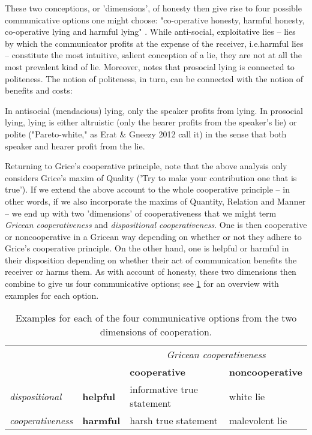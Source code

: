 These two conceptions, or 'dimensions', of honesty then give rise to four possible communicative options one might choose: "co-operative honesty, harmful honesty, co-operative lying and harmful lying" \citep[p.~45]{Dor17}.
While anti-social, exploitative lies -- lies by which the communicator profits at the expense of the receiver, i.e.\@ harmful lies -- constitute the most intuitive, salient conception of a lie, they are not at all the most prevalent kind of lie. Moreover, \citet{Meibauer18} notes that prosocial lying is connected to politeness. The notion of politeness, in turn, can be connected with the notion of benefits and costs:
\begin{quoting}
    In antisocial (mendacious) lying, only the speaker profits from lying. In prosocial lying, lying is either altruistic (only the hearer profits from the speaker's lie) or polite ("Pareto-white," as Erat \& Gneezy 2012 call it) in the sense that both speaker and hearer profit from the lie.
\end{quoting}

Returning to Grice's cooperative principle, note that the above analysis only considers Grice's maxim of Quality ('Try to make your contribution one that is true'). If we extend the above account to the whole cooperative principle -- in other words, if we also incorporate the maxims of Quantity, Relation and Manner -- we end up with two 'dimensions' of cooperativeness that we might term \emph{Gricean cooperativeness} and \emph{dispositional cooperativeness}. One is then cooperative or noncooperative in a Gricean way depending on whether or not they adhere to Grice's cooperative principle. On the other hand, one is helpful or harmful in their disposition depending on whether their act of communication benefits the receiver or harms them.
As with  account of honesty,
these two dimensions then combine to give us four communicative options; see \cref{tab:dimensions-of-cooperation} for an overview with examples for each option.

\begin{table}[ht]
  \centering
\begin{tabular}{lll|l}
  \cline{3-4}
  & & \multicolumn{2}{c}{\emph{Gricean cooperativeness}} \\ \cline{3-4}
  & & \textbf{cooperative} & \textbf{noncooperative} \\ \hline
  \emph{dispositional} &
  \textbf{helpful} & informative true statement & white lie \\ \cline{2-4}
  \emph{cooperativeness} &
  \textbf{harmful} & harsh true statement & malevolent lie \\ \hline
\end{tabular}
\caption{Examples for each of the four communicative options from the two dimensions of cooperation.}
\label{tab:dimensions-of-cooperation}
\end{table}

